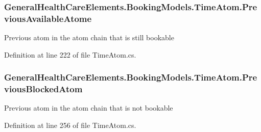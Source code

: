 \subsubsection[{\texorpdfstring{Previous\+Available\+Atome}{PreviousAvailableAtome}}]{ General\+Health\+Care\+Elements.\+Booking\+Models.\+Time\+Atom.\+Previous\+Available\+Atome\hspace{0.3cm}{\ttfamily [get]}}\hypertarget{class_general_health_care_elements_1_1_booking_models_1_1_time_atom_a228a59de468a468681349c0acf0dc1b3}{}\label{class_general_health_care_elements_1_1_booking_models_1_1_time_atom_a228a59de468a468681349c0acf0dc1b3}


Previous atom in the atom chain that is still bookable 



Definition at line 222 of file Time\+Atom.\+cs.

\subsubsection[{\texorpdfstring{Previous\+Blocked\+Atom}{PreviousBlockedAtom}}]{ General\+Health\+Care\+Elements.\+Booking\+Models.\+Time\+Atom.\+Previous\+Blocked\+Atom\hspace{0.3cm}{\ttfamily [get]}}\hypertarget{class_general_health_care_elements_1_1_booking_models_1_1_time_atom_aafaad6f374eb4208c54fd12b3f135429}{}\label{class_general_health_care_elements_1_1_booking_models_1_1_time_atom_aafaad6f374eb4208c54fd12b3f135429}


Previous atom in the atom chain that is not bookable 



Definition at line 256 of file Time\+Atom.\+cs.


